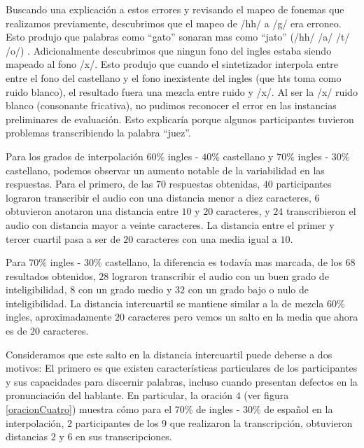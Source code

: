Buscando una explicación a estos errores y revisando el mapeo de fonemas que realizamos previamente, descubrimos que el mapeo de /hh/ a /g/ era erroneo. Esto produjo que palabras como ``gato'' sonaran mas como ``jato'' (/hh/ /a/ /t/ /o/) \revisarFonos. Adicionalmente descubrimos que ningun fono del ingles estaba siendo mapeado al fono /x/. Esto produjo que cuando el sintetizador interpola entre entre el fono del castellano y el fono inexistente del ingles (que hts toma como ruido blanco), el resultado fuera una mezcla entre ruido y /x/. Al ser la /x/ ruido blanco (consonante fricativa), no pudimos reconocer el error en las instancias preliminares de evaluación. Esto explicaría porque algunos participantes tuvieron problemas transcribiendo la palabra ``juez''.

Para los grados de interpolación $60\%$ ingles - $40\%$ castellano y $70\%$ ingles - $30\%$ castellano, podemos observar un aumento notable de la variabilidad en las respuestas. Para el primero, de las $70$ respuestas obtenidas, $40$ participantes lograron transcribir el audio con una distancia menor a diez caracteres, $6$ obtuvieron anotaron una distancia entre $10$ y $20$ caracteres, y $24$ transcribieron el audio con distancia mayor a veinte caracteres. La distancia entre el primer y tercer cuartil pasa a ser de $20$ caracteres con una media igual a $10$.

Para $70\%$ ingles - $30\%$ castellano, la diferencia es todavía mas marcada, de los $68$ resultados obtenidos, $28$ lograron transcribir el audio con un buen grado de inteligibilidad, $8$ con un grado medio y $32$ con un grado bajo o nulo de inteligibilidad. La distancia intercuartil se mantiene similar a la de mezcla $60\%$ ingles, aproximadamente $20$ caracteres pero vemos un salto en la media que ahora es de $20$ caracteres.

Consideramos que este salto en la distancia intercuartil puede deberse a dos motivos: El primero es que existen características particulares de los participantes y sus capacidades para discernir palabras, incluso cuando presentan defectos en la pronunciación del hablante. En particular, la oración $4$ (ver figura \ref{oracionCuatro}) muestra cómo para el $70\%$ de ingles - $30\%$ de español en la interpolación, $2$ participantes de los $9$ que realizaron la transcripción, obtuvieron distancias $2$ y $6$ en sus transcripciones.

